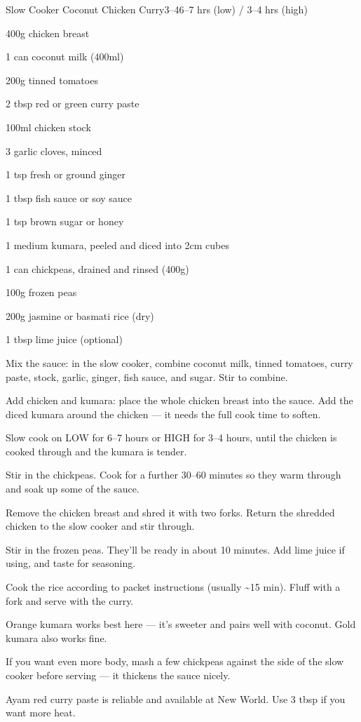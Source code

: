 \begin{recipebox}{Slow Cooker Coconut Chicken Curry}{3--4}{6--7 hrs (low) / 3--4 hrs (high)}

\begin{ingredients}
  \item 400g chicken breast
  \item 1 can coconut milk (400ml)
  \item 200g tinned tomatoes
  \item 2 tbsp red or green curry paste
  \item 100ml chicken stock
  \item 3 garlic cloves, minced
  \item 1 tsp fresh or ground ginger
  \item 1 tbsp fish sauce or soy sauce
  \item 1 tsp brown sugar or honey
  \item 1 medium kumara, peeled and diced into 2cm cubes
  \item 1 can chickpeas, drained and rinsed (400g)
  \item 100g frozen peas
  \item 200g jasmine or basmati rice (dry)
  \item 1 tbsp lime juice (optional)
\end{ingredients}

\begin{method}
  \item Mix the sauce: in the slow cooker, combine coconut milk, tinned tomatoes, curry paste, stock, garlic, ginger, fish sauce, and sugar. Stir to combine.
  \item Add chicken and kumara: place the whole chicken breast into the sauce. Add the diced kumara around the chicken --- it needs the full cook time to soften.
  \item Slow cook on LOW for 6--7 hours or HIGH for 3--4 hours, until the chicken is cooked through and the kumara is tender.
  \item Stir in the chickpeas. Cook for a further 30--60 minutes so they warm through and soak up some of the sauce.
  \item Remove the chicken breast and shred it with two forks. Return the shredded chicken to the slow cooker and stir through.
  \item Stir in the frozen peas. They'll be ready in about 10 minutes. Add lime juice if using, and taste for seasoning.
  \item Cook the rice according to packet instructions (usually \textasciitilde15 min). Fluff with a fork and serve with the curry.
\end{method}

\begin{notes}
Orange kumara works best here --- it's sweeter and pairs well with coconut. Gold kumara also works fine.

If you want even more body, mash a few chickpeas against the side of the slow cooker before serving --- it thickens the sauce nicely.

Ayam red curry paste is reliable and available at New World. Use 3 tbsp if you want more heat.
\end{notes}

\end{recipebox}